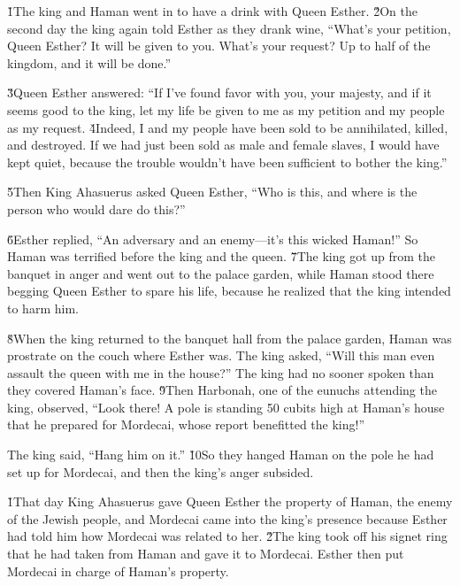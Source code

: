 \v{1}The king and Haman went in to have a drink with Queen Esther. \v{2}On the second day the king again told Esther as they drank wine, ``What's your petition, Queen Esther? It will be given to you. What's your request? Up to half of the kingdom, and it will be done.''

\v{3}Queen Esther answered: ``If I've found favor with you, your majesty, and if it seems good to the king, let my life be given to me as my petition and my people as my request. \v{4}Indeed, I and my people have been sold to be annihilated, killed, and destroyed. If we had just been sold as male and female slaves, I would have kept quiet, because the trouble wouldn't have been sufficient to bother the king.''

\v{5}Then King Ahasuerus asked Queen Esther, ``Who is this, and where is the person who would dare do this?''

\v{6}Esther replied, ``An adversary and an enemy---it's this wicked Haman!'' So Haman was terrified before the king and the queen. \v{7}The king got up from the banquet in anger and went out to the palace garden, while Haman stood there begging Queen Esther to spare his life, because he realized that the king intended to harm him.

\v{8}When the king returned to the banquet hall from the palace garden, Haman was prostrate on the couch where Esther was. The king asked, ``Will this man even assault the queen with me in the house?'' The king had no sooner spoken than they covered Haman's face. \v{9}Then Harbonah, one of the eunuchs attending the king, observed, ``Look there! A pole is standing 50 cubits high at Haman's house that he prepared for Mordecai, whose report benefitted the king!''

The king said, ``Hang him on it.'' \v{10}So they hanged Haman on the pole he had set up for Mordecai, and then the king's anger subsided.

\v{1}That day King Ahasuerus gave Queen Esther the property of Haman, the enemy of the Jewish people, and Mordecai came into the king's presence because Esther had told him how Mordecai was related to her. \v{2}The king took off his signet ring that he had taken from Haman and gave it to Mordecai. Esther then put Mordecai in charge of Haman's property.

